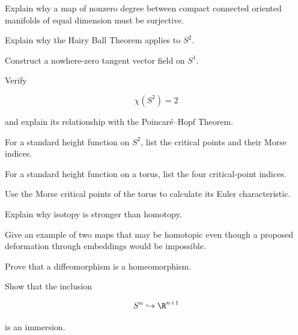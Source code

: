 \begin{exercise}[2]
Explain why a map of nonzero degree between compact connected oriented
manifolds of equal dimension must be surjective.
\end{exercise}

\begin{exercise}[2]
Explain why the Hairy Ball Theorem applies to \(S^2\).
\end{exercise}

\begin{exercise}[2]
Construct a nowhere-zero tangent vector field on \(S^1\).
\end{exercise}

\begin{exercise}[2]
Verify

\[
\chi(S^2)=2
\]

and explain its relationship with the Poincar\'e--Hopf Theorem.
\end{exercise}

\begin{exercise}[2]
For a standard height function on \(S^2\), list the critical points and
their Morse indices.
\end{exercise}

\begin{exercise}[2]
For a standard height function on a torus, list the four critical-point
indices.
\end{exercise}

\begin{exercise}[2]
Use the Morse critical points of the torus to calculate its Euler
characteristic.
\end{exercise}

\begin{exercise}[2]
Explain why isotopy is stronger than homotopy.
\end{exercise}

\begin{exercise}[2]
Give an example of two maps that may be homotopic even though a proposed
deformation through embeddings would be impossible.
\end{exercise}

\begin{exercise}[3]
Prove that a diffeomorphism is a homeomorphism.
\end{exercise}

\begin{exercise}[3]
Show that the inclusion

\[
S^n\hookrightarrow\R^{n+1}
\]

is an immersion.
\end{exercise}

